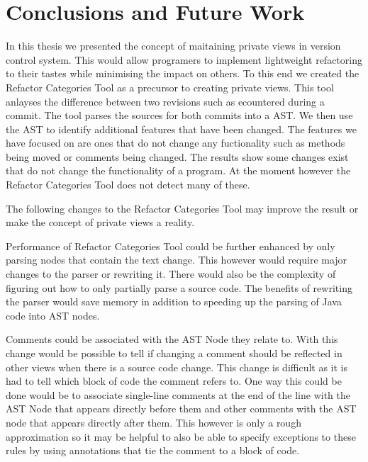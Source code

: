 
\chapter{Conclusions and Future Work}\label{C:con}

In this thesis we presented the concept of maitaining private views in version control system. 
This would allow programers to implement lightweight refactoring to their tastes while minimising the impact on others.  
To this end we created the Refactor Categories Tool as a precursor to creating private views. 
This tool anlayses the difference between two revisions such as ecountered during a commit.  
The tool parses the sources for both commits into a AST. 
We then use the AST to identify additional features that have been changed. 
The features we have focused on are ones that do not change any fuctionality such as methods being moved or comments being changed. 
The results show some changes exist that do not change the functionality of a program.
At the moment however the Refactor Categories Tool does not detect many of these.  

The following changes to the Refactor Categories Tool may improve the result or make the concept of private views a reality.

Performance of Refactor Categories Tool could be further enhanced by only parsing nodes that contain the text change.  This however would require major changes to the parser or rewriting it. There would also be the complexity of figuring out how to only partially parse a source code. The benefits of rewriting the parser would save memory in addition to speeding up the parsing of Java code into AST nodes.


Comments could be associated with the AST Node they relate to.  With this change would be possible to tell if changing a comment should be reflected in other views when there is a source code change. This change is difficult as it is had to tell which block of code the comment refers to.  One way this could be done would be to associate single-line comments at the end of the line with the AST Node that appears directly before them and other comments with the AST node that appears directly after them.  This however is only a rough approximation so it may be helpful to also be able to specify exceptions to these rules by using annotations that tie the comment to a block of code.

